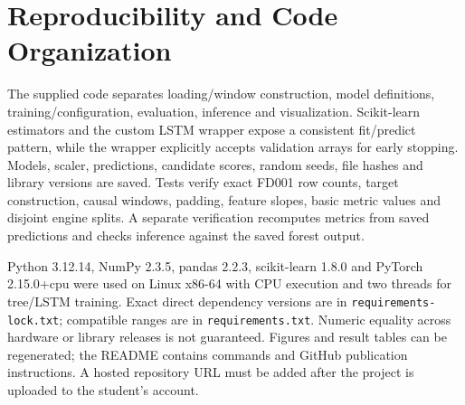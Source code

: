 \documentclass[11pt]{article}
\begin{document}
\section{Reproducibility and Code Organization}
The supplied code separates loading/window construction, model definitions, training/configuration, evaluation, inference and visualization. Scikit-learn estimators and the custom LSTM wrapper expose a consistent fit/predict pattern, while the wrapper explicitly accepts validation arrays for early stopping. Models, scaler, predictions, candidate scores, random seeds, file hashes and library versions are saved. Tests verify exact FD001 row counts, target construction, causal windows, padding, feature slopes, basic metric values and disjoint engine splits. A separate verification recomputes metrics from saved predictions and checks inference against the saved forest output.

Python 3.12.14, NumPy 2.3.5, pandas 2.2.3, scikit-learn 1.8.0 and PyTorch 2.15.0+cpu were used on Linux x86-64 with CPU execution and two threads for tree/LSTM training. Exact direct dependency versions are in \texttt{requirements-lock.txt}; compatible ranges are in \texttt{requirements.txt}. Numeric equality across hardware or library releases is not guaranteed. Figures and result tables can be regenerated; the README contains commands and GitHub publication instructions. A hosted repository URL must be added after the project is uploaded to the student's account.
\end{document}
